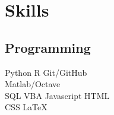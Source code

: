 \documentclass[]{cv-template}
\begin{document}
\begin{minipage}[t]{0.33\textwidth}

\section{Skills}
\subsection{Programming}
Python \textbullet{}   R \textbullet{} Git/GitHub \\
Matlab/Octave\\ 
SQL \textbullet{} VBA \textbullet{} Javascript \textbullet{} HTML \\
CSS \textbullet{} \LaTeX\
\sectionsep

%
%

\end{minipage} 
\hfill
\end{document}
